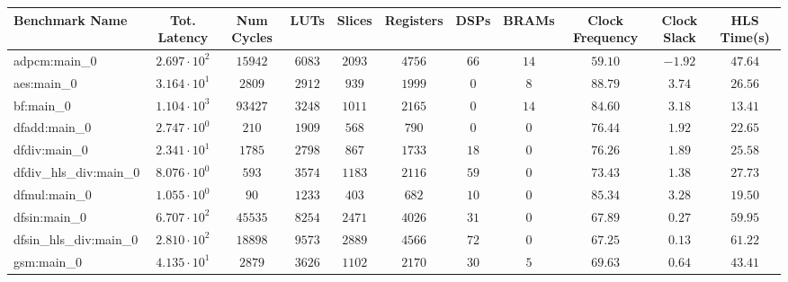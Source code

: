 \begin{tabular}{|l|c|c|c|c|c|c|c|c|c|c|}
\hline
Benchmark Name          & Tot. Latency           & Num Cycles & LUTs      & Slices    & Registers & DSPs    & BRAMs   & Clock Frequency & Clock Slack & HLS Time(s) \\
\hline
adpcm:main\_0           & $ 2.697 \cdot 10^{2} $ & $ 15942  $ & $ 6083  $ & $ 2093  $ & $ 4756  $ & $ 66  $ & $ 14  $ & $ 59.10       $ & $ -1.92   $ & $ 47.64   $ \\
aes:main\_0             & $ 3.164 \cdot 10^{1} $ & $ 2809   $ & $ 2912  $ & $ 939   $ & $ 1999  $ & $ 0   $ & $ 8   $ & $ 88.79       $ & $ 3.74    $ & $ 26.56   $ \\
bf:main\_0              & $ 1.104 \cdot 10^{3} $ & $ 93427  $ & $ 3248  $ & $ 1011  $ & $ 2165  $ & $ 0   $ & $ 14  $ & $ 84.60       $ & $ 3.18    $ & $ 13.41   $ \\
dfadd:main\_0           & $ 2.747 \cdot 10^{0} $ & $ 210    $ & $ 1909  $ & $ 568   $ & $ 790   $ & $ 0   $ & $ 0   $ & $ 76.44       $ & $ 1.92    $ & $ 22.65   $ \\
dfdiv:main\_0           & $ 2.341 \cdot 10^{1} $ & $ 1785   $ & $ 2798  $ & $ 867   $ & $ 1733  $ & $ 18  $ & $ 0   $ & $ 76.26       $ & $ 1.89    $ & $ 25.58   $ \\
dfdiv\_hls\_div:main\_0 & $ 8.076 \cdot 10^{0} $ & $ 593    $ & $ 3574  $ & $ 1183  $ & $ 2116  $ & $ 59  $ & $ 0   $ & $ 73.43       $ & $ 1.38    $ & $ 27.73   $ \\
dfmul:main\_0           & $ 1.055 \cdot 10^{0} $ & $ 90     $ & $ 1233  $ & $ 403   $ & $ 682   $ & $ 10  $ & $ 0   $ & $ 85.34       $ & $ 3.28    $ & $ 19.50   $ \\
dfsin:main\_0           & $ 6.707 \cdot 10^{2} $ & $ 45535  $ & $ 8254  $ & $ 2471  $ & $ 4026  $ & $ 31  $ & $ 0   $ & $ 67.89       $ & $ 0.27    $ & $ 59.95   $ \\
dfsin\_hls\_div:main\_0 & $ 2.810 \cdot 10^{2} $ & $ 18898  $ & $ 9573  $ & $ 2889  $ & $ 4566  $ & $ 72  $ & $ 0   $ & $ 67.25       $ & $ 0.13    $ & $ 61.22   $ \\
gsm:main\_0             & $ 4.135 \cdot 10^{1} $ & $ 2879   $ & $ 3626  $ & $ 1102  $ & $ 2170  $ & $ 30  $ & $ 5   $ & $ 69.63       $ & $ 0.64    $ & $ 43.41   $ \\

\end{tabular}
